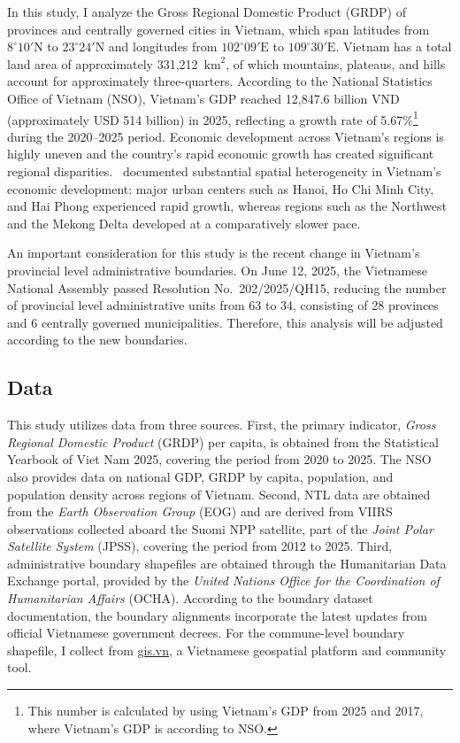 \documentclass[11pt]{article} %
\newcommand{\km}{\text{km}}
\begin{document}
In this study, I analyze the Gross Regional Domestic Product (GRDP) of provinces and centrally governed cities in Vietnam, which span latitudes from $8^\circ 10' \mathrm{N}$ to $23^\circ 24' \mathrm{N}$ and longitudes from $102^\circ 09' \mathrm{E}$ to $109^\circ 30' \mathrm{E}$. Vietnam has a total land area of approximately 331,212~$\km^2$, of which mountains, plateaus, and hills account for approximately three-quarters. According to the National Statistics Office of Vietnam (NSO), Vietnam's GDP reached  12,847.6 billion VND (approximately USD 514 billion) in 2025, reflecting a growth rate of 5.67\%\footnote{This number is calculated by using Vietnam's GDP from 2025 and 2017, where Vietnam's GDP is according to NSO.
} during the 2020--2025 period. Economic development across Vietnam's regions is highly uneven and the country's rapid economic growth has created significant regional disparities.~\textcite{zha:VN-GDP-disparities} documented substantial spatial heterogeneity in Vietnam's economic development: major urban centers such as Hanoi, Ho Chi Minh City, and Hai Phong experienced rapid growth, whereas regions such as the Northwest and the Mekong Delta developed at a comparatively slower pace.

An important consideration for this study is the recent change in Vietnam's provincial level administrative boundaries. On June 12, 2025, the Vietnamese National Assembly passed Resolution No.~202/2025/QH15, reducing the number of provincial level administrative units from 63 to 34, consisting of 28 provinces and 6 centrally governed municipalities. Therefore, this analysis will be adjusted according to the new boundaries.

\subsection{Data}

This study utilizes data from three sources. First, the primary indicator, \emph{Gross Regional Domestic Product} (GRDP) per capita, is obtained from the Statistical Yearbook of Viet Nam 2025, covering the period from 2020 to 2025. The NSO also provides data on national GDP, GRDP by capita, population, and population density across regions of Vietnam. Second, NTL data are obtained from the \emph{Earth Observation Group} (EOG) and are derived from VIIRS observations collected aboard the Suomi NPP satellite, part of the \emph{Joint Polar Satellite System} (JPSS), covering the period from 2012 to 2025. Third, administrative boundary shapefiles are obtained through the Humanitarian Data Exchange portal, provided by the \emph{United Nations Office for the Coordination of Humanitarian Affairs} (OCHA). According to the boundary dataset documentation, the boundary alignments incorporate the latest updates from official Vietnamese government decrees. For the commune-level boundary shapefile, I collect from \href{https://gis.vn/}{gis.vn}, a Vietnamese geospatial platform and community tool.
\end{document}
